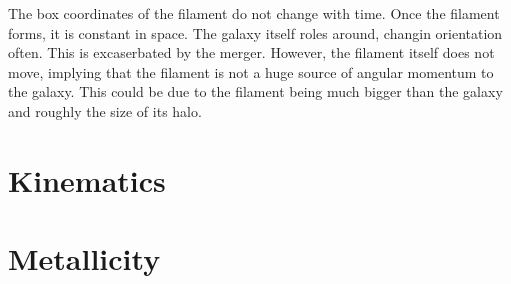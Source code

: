 \documentclass{article}
\begin{document}
The box coordinates of the filament do not change with time. Once the filament
forms, it is constant in space. The galaxy itself roles around, changin
orientation often. This is excaserbated by the merger. However, the filament
itself does not move, implying that the filament is not a huge source of angular
momentum to the galaxy. This could be due to the filament being much bigger than
the galaxy and roughly the size of its halo. 


\section{Kinematics}



\section{Metallicity}
\end{document}
